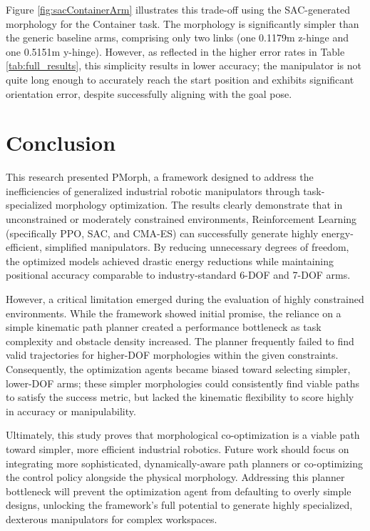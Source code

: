 \documentclass[defaultstyle,11pt]{thesis}
\begin{document}
Figure \ref{fig:sacContainerArm} illustrates this trade-off using the SAC-generated morphology for the Container task. The morphology is significantly simpler than the generic baseline arms, comprising only two links (one 0.1179m z-hinge and one 0.5151m y-hinge). However, as reflected in the higher error rates in Table \ref{tab:full_results}, this simplicity results in lower accuracy; the manipulator is not quite long enough to accurately reach the start position and exhibits significant orientation error, despite successfully aligning with the goal pose.

\chapter{Conclusion}

This research presented PMorph, a framework designed to address the inefficiencies of generalized industrial robotic manipulators through task-specialized morphology optimization. The results clearly demonstrate that in unconstrained or moderately constrained environments, Reinforcement Learning (specifically PPO, SAC, and CMA-ES) can successfully generate highly energy-efficient, simplified manipulators. By reducing unnecessary degrees of freedom, the optimized models achieved drastic energy reductions while maintaining positional accuracy comparable to industry-standard 6-DOF and 7-DOF arms. 

However, a critical limitation emerged during the evaluation of highly constrained environments. While the framework showed initial promise, the reliance on a simple kinematic path planner created a performance bottleneck as task complexity and obstacle density increased. The planner frequently failed to find valid trajectories for higher-DOF morphologies within the given constraints. Consequently, the optimization agents became biased toward selecting simpler, lower-DOF arms; these simpler morphologies could consistently find viable paths to satisfy the success metric, but lacked the kinematic flexibility to score highly in accuracy or manipulability. 

Ultimately, this study proves that morphological co-optimization is a viable path toward simpler, more efficient industrial robotics. Future work should focus on integrating more sophisticated, dynamically-aware path planners or co-optimizing the control policy alongside the physical morphology. Addressing this planner bottleneck will prevent the optimization agent from defaulting to overly simple designs, unlocking the framework's full potential to generate highly specialized, dexterous manipulators for complex workspaces.
\end{document}
